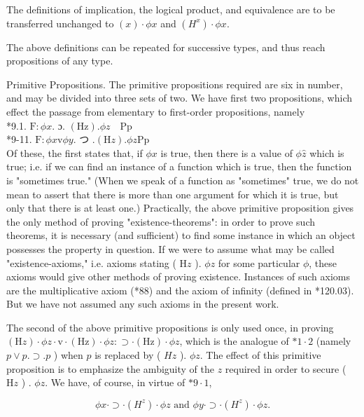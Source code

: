 \documentclass[10pt]{article}
\begin{document}
The definitions of implication, the logical product, and equivalence are to be transferred unchanged to $(x) \cdot \phi x$ and $\left(H^{x}\right) \cdot \phi x$.

The above definitions can be repeated for successive types, and thus reach propositions of any type.

Primitive Propositions. The primitive propositions required are six in number, and may be divided into three sets of two. We have first two propositions, which effect the passage from elementary to first-order propositions, namely\\
*9.1. $\mathrm{F}: \phi x$. ɔ. $(\mathrm{Hz}) . \phi z \quad \mathrm{Pp}$\\
*9-11. $\mathrm{F}: \phi x \mathrm{v} \phi y$. つ $.(\mathrm{H} z) . \phi z \mathrm{Pp}$\\
Of these, the first states that, if $\phi x$ is true, then there is a value of $\phi \hat{z}$ which is true; i.e. if we can find an instance of a function which is true, then the function is "sometimes true." (When we speak of a function as "sometimes" true, we do not mean to assert that there is more than one argument for which it is true, but only that there is at least one.) Practically, the above primitive proposition gives the only method of proving "existence-theorems": in order to prove such theorems, it is necessary (and sufficient) to find some instance in which an object possesses the property in question. If we were to assume what may be called "existence-axioms," i.e. axioms stating ( $\mathrm{H} z$ ). $\phi z$ for some particular $\phi$, these axioms would give other methods of proving existence. Instances of such axioms are the multiplicative axiom (*88) and the axiom of infinity (defined in *120.03). But we have not assumed any such axioms in the present work.

The second of the above primitive propositions is only used once, in proving $(\mathrm{H} z) \cdot \phi z \cdot \mathrm{v} \cdot(\mathrm{Hz}) \cdot \phi z: \supset \cdot(\mathrm{Hz}) \cdot \phi z$, which is the analogue of $* 1 \cdot 2$ (namely $p \vee p . \supset . p$ ) when $p$ is replaced by ( $H z$ ). $\phi z$. The effect of this primitive proposition is to emphasize the ambiguity of the $z$ required in order to secure ( $\mathrm{H} z$ ) . $\phi z$. We have, of course, in virtue of $* 9 \cdot 1$,

$$
\phi x \cdot \supset \cdot\left(H^{z}\right) \cdot \phi z \text { and } \phi y \cdot \supset \cdot\left(H^{z}\right) \cdot \phi z .
$$
\end{document}
